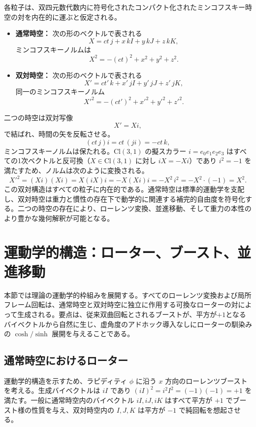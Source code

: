 \documentclass[dvipdfmx,a4paper]{article}
\begin{document}
各粒子は、双四元数代数内に符号化されたコンパクト化されたミンコフスキー時空の対を内在的に運ぶと仮定される。
\begin{itemize}
  \item \textbf{通常時空：} 次の形のベクトルで表される
  \[
  X = ct \, j + x \, kI + y \, kJ + z \, kK,
  \]
  ミンコフスキーノルムは
  \[
  X^2 = -(ct)^2 + x^2 + y^2 + z^2.
  \]

  \item \textbf{双対時空：} 次の形のベクトルで表される
  \[
  X' = ct' \, k + x' \, jI + y' \, jJ + z' \, jK,
  \]
  同一のミンコフスキーノルム
  \[
  X'^2 = -(ct')^2 + x'^2 + y'^2 + z'^2.
  \]
\end{itemize}
二つの時空は双対写像
\[
X' = X i,
\]
で結ばれ、時間の矢を反転させる。
\[
(ct \, j) i = ct \, (j i) = -ct \, k,
\]
ミンコフスキーノルムは保たれる。$\mathrm{Cl}(3,1)$ の擬スカラー $i = e_0 e_1 e_2 e_3$ はすべての1次ベクトルと反可換（$X \in \mathrm{Cl}(3,1)$ に対し $i X = -X i$）であり $i^2 = -1$ を満たすため、ノルムは次のように変換される。
\[
X'^2 = (X i)(X i) = X (i X) i = -X (X i) i = -X^2\, i^2 = -X^2 \cdot (-1) = X^2.
\]
この双対構造はすべての粒子に内在的である。通常時空は標準的運動学を支配し、双対時空は重力と慣性の存在下で動学的に関連する補完的自由度を符号化する。二つの時空の存在により、ローレンツ変換、並進移動、そして重力の本性のより豊かな幾何解釈が可能となる。

\section{運動学的構造：ローター、ブースト、並進移動}
\label{sec:kinematics}

本節では理論の運動学的枠組みを展開する。すべてのローレンツ変換および局所フレーム回転は、通常時空と双対時空に独立に作用する可換なローターの対によって生成される。要点は、従来双曲回転とされるブーストが、平方が$+1$となるバイベクトルから自然に生じ、虚角度のアドホック導入なしにローターの馴染みの $\cosh/\sinh$ 展開を与えることである。

\subsection{通常時空におけるローター}

運動学的構造を示すため、ラピディティ $\phi$ に沿う $x$ 方向のローレンツブーストを考える。生成バイベクトルは $iI$ であり $(iI)^2 = i^2 I^2 = (-1)(-1) = +1$ を満たす。一般に通常時空内のバイベクトル $iI,iJ,iK$ はすべて平方が $+1$ でブースト様の性質を与え、双対時空内の $I,J,K$ は平方が $-1$ で純回転を想起させる。
\end{document}
